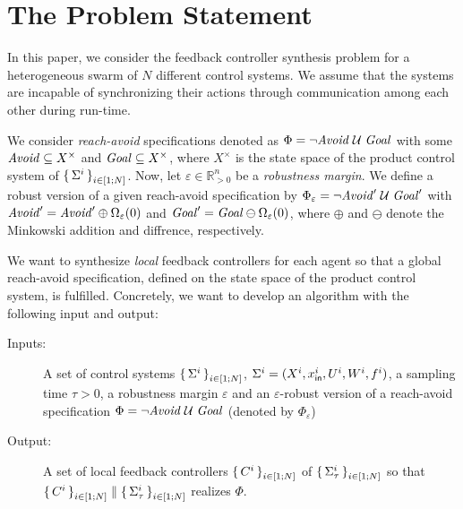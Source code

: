 
\section{The Problem Statement}
\label{sec:problem}
In this paper, we consider the feedback controller synthesis problem for a heterogeneous swarm of $N$ different control systems.
We assume that the systems are incapable of synchronizing their actions through communication among each other during run-time.

We consider \emph{reach-avoid} specifications denoted as $\Phi=\lnot\mathit{Avoid}\;\mathcal{U}\;\mathit{Goal}$ with some $\mathit{Avoid}\subseteq X^\times$ and $\mathit{Goal}\subseteq X^\times$, where $X^\times$ is the state space of the product control system of $\set{\Sigma^i}_{i\in [1;N]}$. Now, let $\varepsilon\in \mathbb{R}^n_{>0}$ be a \emph{robustness margin}. We define a robust version of a given reach-avoid specification by $\Phi_\varepsilon=\lnot\mathit{Avoid}'\;\mathcal{U}\;\mathit{Goal}'$ with $\mathit{Avoid}'=\mathit{Avoid}'\oplus\Omega_\varepsilon(0)$ and $\mathit{Goal}'=\mathit{Goal}\ominus\Omega_\varepsilon(0)$, where $\oplus$ and $\ominus$ denote the Minkowski addition and diffrence, respectively. %


We want to synthesize \emph{local} feedback controllers for each agent so that a global reach-avoid specification, defined on the state space of the product control system, is fulfilled.
Concretely, we want to develop an algorithm with the following input and output:
\begin{description}
	\item[Inputs:] A set of control systems $\set{\Sigma^i}_{i\in [1;N]}$, $\Sigma^i=(X^i,x_{\mathsf{in}}^i,U^i,W^i,f^i)$, a sampling time $\tau >0$, a robustness margin $\varepsilon$ and an $\varepsilon$-robust version of a reach-avoid specification $\Phi=\lnot\mathit{Avoid}\;\mathcal{U}\;\mathit{Goal}$ (denoted by $\Phi_\varepsilon$)%
	\item[Output:] A set of local feedback controllers $\set{C^i}_{i\in [1;N]}$ of $\set{\Sigma^i_\tau}_{i\in [1;N]}$ so that $\set{C^i}_{i\in [1;N]}\parallel \set{\Sigma_\tau^i}_{i\in [1;N]}$ realizes $\Phi$. 
\end{description}

